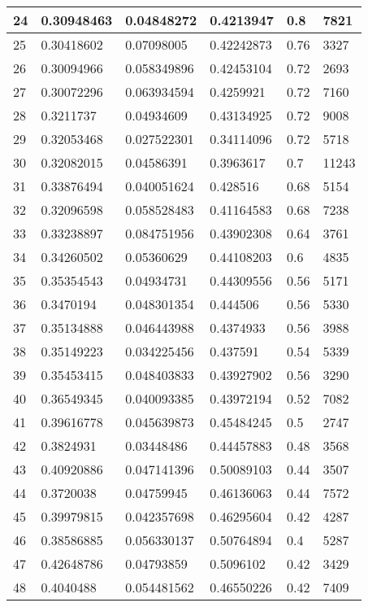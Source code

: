 \begin{longtable}{|l|l|l|l|l|l|}
24 & 0.30948463 & 0.04848272 & 0.4213947 & 0.8 & 7821 \\ \hline 
25 & 0.30418602 & 0.07098005 & 0.42242873 & 0.76 & 3327 \\ \hline 
26 & 0.30094966 & 0.058349896 & 0.42453104 & 0.72 & 2693 \\ \hline 
27 & 0.30072296 & 0.063934594 & 0.4259921 & 0.72 & 7160 \\ \hline 
28 & 0.3211737 & 0.04934609 & 0.43134925 & 0.72 & 9008 \\ \hline 
29 & 0.32053468 & 0.027522301 & 0.34114096 & 0.72 & 5718 \\ \hline 
30 & 0.32082015 & 0.04586391 & 0.3963617 & 0.7 & 11243 \\ \hline 
31 & 0.33876494 & 0.040051624 & 0.428516 & 0.68 & 5154 \\ \hline 
32 & 0.32096598 & 0.058528483 & 0.41164583 & 0.68 & 7238 \\ \hline 
33 & 0.33238897 & 0.084751956 & 0.43902308 & 0.64 & 3761 \\ \hline 
34 & 0.34260502 & 0.05360629 & 0.44108203 & 0.6 & 4835 \\ \hline 
35 & 0.35354543 & 0.04934731 & 0.44309556 & 0.56 & 5171 \\ \hline 
36 & 0.3470194 & 0.048301354 & 0.444506 & 0.56 & 5330 \\ \hline 
37 & 0.35134888 & 0.046443988 & 0.4374933 & 0.56 & 3988 \\ \hline 
38 & 0.35149223 & 0.034225456 & 0.437591 & 0.54 & 5339 \\ \hline 
39 & 0.35453415 & 0.048403833 & 0.43927902 & 0.56 & 3290 \\ \hline 
40 & 0.36549345 & 0.040093385 & 0.43972194 & 0.52 & 7082 \\ \hline 
41 & 0.39616778 & 0.045639873 & 0.45484245 & 0.5 & 2747 \\ \hline 
42 & 0.3824931 & 0.03448486 & 0.44457883 & 0.48 & 3568 \\ \hline 
43 & 0.40920886 & 0.047141396 & 0.50089103 & 0.44 & 3507 \\ \hline 
44 & 0.3720038 & 0.04759945 & 0.46136063 & 0.44 & 7572 \\ \hline 
45 & 0.39979815 & 0.042357698 & 0.46295604 & 0.42 & 4287 \\ \hline 
46 & 0.38586885 & 0.056330137 & 0.50764894 & 0.4 & 5287 \\ \hline 
47 & 0.42648786 & 0.04793859 & 0.5096102 & 0.42 & 3429 \\ \hline 
48 & 0.4040488 & 0.054481562 & 0.46550226 & 0.42 & 7409 \\ \hline 

\end{longtable}
